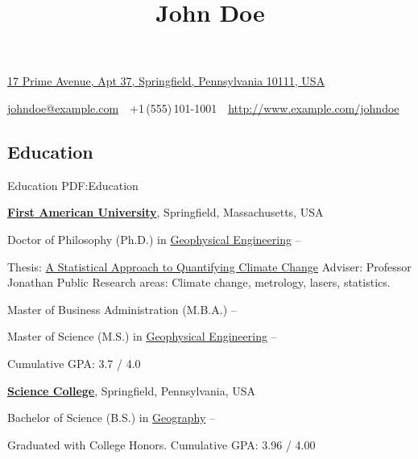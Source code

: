 \documentclass[a4paper,10pt,oneside]{article}
\begin{document}

\title{John Doe}

\begin{subtitle}
\href{https://www.google.com/maps/place/17+Prime+Avenue,+Springfield,+Pennsylvania+10111,+USA}
{17 Prime Avenue, Apt 37, Springfield, Pennsylvania 10111, USA}
\par
\href{mailto:johndoe@example.com}
{johndoe@example.com}
\,\BulletSymbol\,
+1\,(555)\,101-1001
\,\BulletSymbol\,
\href{http://www.example.com/johndoe}
{http://www.example.com/johndoe}
\end{subtitle}

\begin{body}


\section
{Education}
{Education}
{PDF:Education}

\href{http://www.example.com/my-university}
{\textbf{First American University}},
Springfield, Massachusetts, USA

\EntryGapNoBreak
Doctor of Philosophy (Ph.D.) in
\href{http://www.example.com/my-department}
{Geophysical Engineering}
\hfill
{} --
\begin{detail}
\BulletItem
Thesis:
\href{http://www.example.com/my-phd-thesis}
{A Statistical Approach to Quantifying Climate Change}
\BulletItem
Adviser:
Professor Jonathan Public
\BulletItem
Research areas:
Climate change, metrology, lasers, statistics.
\end{detail}

\EntryGapNoBreak
Master of Business Administration (M.B.A.)
\hfill
{} --

\EntryGapNoBreak
Master of Science (M.S.) in
\href{http://www.example.com/my-department}
{Geophysical Engineering}
\hfill
{} --
\begin{detail}
\BulletItem
Cumulative GPA: 3.7 / 4.0
\end{detail}

\BigEntryGap
\href{http://www.example.com/my-college}
{\textbf{Science College}},
Springfield, Pennsylvania, USA
\par
Bachelor of Science (B.S.) in
\href{http://www.example.com/my-department}
{Geography}
\hfill
{} --
\begin{detail}
\BulletItem
Graduated with College Honors.
\BulletItem
Cumulative GPA: 3.96 / 4.00
\end{detail}


\end{body}
\end{document}
